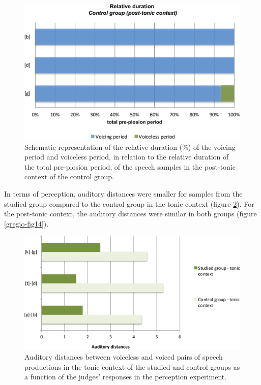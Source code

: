 \begin{figure}
\centering
\includegraphics[width=0.9\linewidth]{imgs/gregio-image12.png}
\caption{Schematic representation of the relative duration (\%) of the voicing period and voiceless period, in relation to the relative duration of the total pre-plosion period, of the speech samples in the post-tonic context of the control group.} 
\label{gregio-fig12}
\end{figure}

In terms of perception, auditory distances were smaller for samples from the
studied group compared to the control group in the tonic context (figure \ref{gregio-fig13}).
For the post-tonic context, the auditory distances were similar in both groups
(figure \ref{gregio-fig14}).

\begin{figure}
\centering
\includegraphics[width=\linewidth]{imgs/gregio-image13.png}
\caption{Auditory distances between voiceless and voiced pairs of speech productions in the tonic context of the studied and control groups as a function of the judges' responses in the perception experiment.} 
\label{gregio-fig13}
\end{figure}


